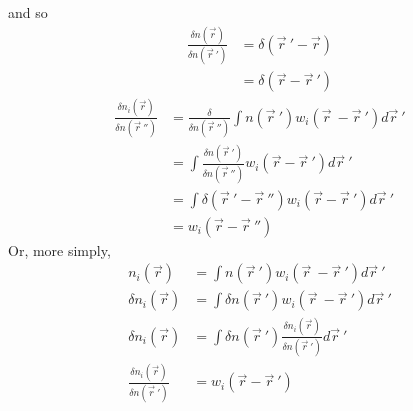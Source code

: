 \documentclass[double,12pt]{beavtex}
\begin{document}
and so
\begin{align} 
  \frac{\delta n(\vec r)}{\delta n(\vec r~')} &= \delta (\vec r~'-\vec r) \\
                                               &= \delta (\vec r-\vec r~') 
\end{align} 
\begin{align} 
   \frac{\delta n_i(\vec r)}{\delta n(\vec r~'')}  &= \frac{\delta}
   {\delta n(\vec r~'')}\int n(\vec r~')w_i(\vec r~-\vec r~')d\vec r~'\\
   &= \int \frac{\delta n(\vec r~')}{\delta n(\vec r~'')}w_i(\vec r
   -\vec r~') d\vec r~' \\
   &= \int \delta (\vec r~' -\vec r~'')w_i(\vec r-\vec r~') d\vec r~'\\
   &= w_i(\vec r-\vec r~'') 
\end{align}
Or, more simply,
\begin{align} 
   n_i(\vec r)  &= \int n(\vec r~')w_i(\vec r~-\vec r~')d\vec r~'\\
   \delta n_i(\vec r)  &= \int \delta n(\vec r~')w_i(\vec r~-\vec r~')d\vec r~'\\
   \delta n_i(\vec r)  &= \int \delta n(\vec r~')\frac{\delta n_i(\vec r)}{\delta n(\vec r~')}d\vec r~'\\
   \frac{\delta n_i(\vec r)}{\delta n(\vec r~')}&= w_i(\vec r-\vec r~') 
\end{align}
\end{document}
